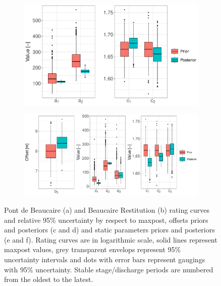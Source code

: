 \documentclass[11pt]{article}
\begin{document}
\begin{figure}[h!]
        \begin{subfigure}{0.39\textwidth}
            \centering
            \includegraphics[width=\linewidth]{Figs/7e-a&csPt.pdf}
            \caption{}
            \label{subfig:a's and c's Pt}
        \end{subfigure}
        \begin{subfigure}{0.41\textwidth}
            \centering
            \includegraphics[width=\linewidth]{Figs/7f-b3_as_cs_Restit.pdf}
            \caption{}
            \label{subfig:bac'sRes}
        \end{subfigure}
        \caption{Pont de Beaucaire (a) and Beaucaire Restitution (b) rating curves and relative 95\% uncertainty by respect to maxpost, offsets priors and posteriors (c and d) and static parameters priors and posteriors (e and f). Rating curves are in logarithmic scale, solid lines represent maxpost values, grey transparent envelops represent 95\% uncertainty intervals and dots with error bars represent gaugings with 95\% uncertainty. Stable stage/discharge periods are numbered from the oldest to the latest.}
        \label{fig:RcsAndParams}
    \end{figure}
    
\end{document}
